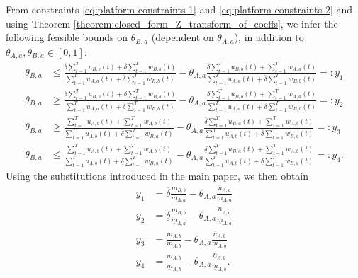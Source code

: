 \documentclass[letterpaper]{article} %
\begin{document}
From constraints \eqref{eq:platform-constraints-1} and \eqref{eq:platform-constraints-2} and using Theorem \ref{theorem:closed_form_Z_transform_of_coeffs}, we infer the following feasible bounds on $\theta_{B,a}$ (dependent on $\theta_{A,a}$), in addition to $\theta_{A,a}, \theta_{B,a} \in [0,1]$:
\begin{align*}
    \theta_{B,a} &\leq \frac{\overline{\delta} \sum_{t=1}^T u_{B,b}(t) + \overline{\delta} \sum_{t=1}^T w_{B,b}(t)}{\sum_{t=1}^T u_{A,a}(t) + \overline{\delta} \sum_{t=1}^T w_{B,b}(t)} - \theta_{A,a} \frac{\overline{\delta} \sum_{t=1}^T u_{B,b}(t) + \sum_{t=1}^T w_{A,a}(t)}{\sum_{t=1}^T u_{A,a}(t) + \overline{\delta} \sum_{t=1}^T w_{B,b}(t)} =: y_1 \\
    \theta_{B,a} &\geq \frac{\underline{\delta} \sum_{t=1}^T u_{B,b}(t) + \underline{\delta} \sum_{t=1}^T w_{B,b}(t)}{\sum_{t=1}^T u_{A,a}(t) + \underline{\delta} \sum_{t=1}^T w_{B,b}(t)} - \theta_{A,a} \frac{\underline{\delta} \sum_{t=1}^T u_{B,b}(t) + \sum_{t=1}^T w_{A,a}(t)}{\sum_{t=1}^T u_{A,a}(t) + \underline{\delta} \sum_{t=1}^T w_{B,b}(t)} =: y_2 \\
    \theta_{B,a} &\geq \frac{\sum_{t=1}^T u_{A,b}(t) + \sum_{t=1}^T w_{A,b}(t)}{\sum_{t=1}^T u_{A,b}(t) + \overline{\delta} \sum_{t=1}^T w_{B,a}(t)} - \theta_{A,a} \frac{\overline{\delta} \sum_{t=1}^T u_{B,a}(t) + \sum_{t=1}^T w_{A,b}(t)}{\sum_{t=1}^T u_{A,b}(t) + \overline{\delta} \sum_{t=1}^T w_{B,a}(t)} =: y_3 \\
    \theta_{B,a} &\leq \frac{\sum_{t=1}^T u_{A,b}(t) + \sum_{t=1}^T w_{A,b}(t)}{\sum_{t=1}^T u_{A,b}(t) + \underline{\delta} \sum_{t=1}^T w_{B,a}(t)} - \theta_{A,a} \frac{\underline{\delta} \sum_{t=1}^T u_{B,a}(t) + \sum_{t=1}^T w_{A,b}(t)}{\sum_{t=1}^T u_{A,b}(t) + \underline{\delta} \sum_{t=1}^T w_{B,a}(t)} =: y_4.
\end{align*}
Using the substitutions introduced in the main paper, we then obtain
\begin{align*}
    y_1 &= \overline{\delta}\frac{m_{B,b}}{\overline{m}_{A,a}} - \theta_{A,a} \frac{\overline{n}_{A,a}}{\overline{m}_{A,a}} \\
    y_2 &= \underline{\delta}\frac{m_{B,b}}{\underline{m}_{A,a}} - \theta_{A,a} \frac{\underline{n}_{A,a}}{\underline{m}_{A,a}} \\
    y_3 &= \frac{m_{A,b}}{\overline{m}_{A,b}} - \theta_{A,a} \frac{\overline{n}_{A,b}}{\overline{m}_{A,b}} \\
    y_4 &= \frac{m_{A,b}}{\underline{m}_{A,b}} - \theta_{A,a} \frac{\underline{n}_{A,b}}{\underline{m}_{A,b}}.
\end{align*}
\end{document}
